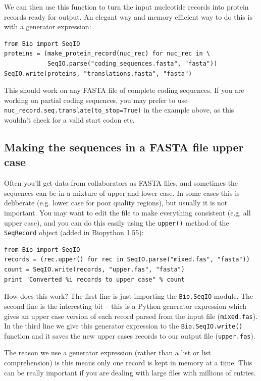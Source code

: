 \documentclass{report}
\begin{document}
We can then use this function to turn the input nucleotide records into protein
records ready for output.  An elegant way and memory efficient way to do this
is with a generator expression:

\begin{verbatim}
from Bio import SeqIO
proteins = (make_protein_record(nuc_rec) for nuc_rec in \
            SeqIO.parse("coding_sequences.fasta", "fasta"))
SeqIO.write(proteins, "translations.fasta", "fasta")
\end{verbatim}

This should work on any FASTA file of complete coding sequences.
If you are working on partial coding sequences, you may prefer to use
\verb|nuc_record.seq.translate(to_stop=True)| in the example above, as
this wouldn't check for a valid start codon etc.

\subsection{Making the sequences in a FASTA file upper case}

Often you'll get data from collaborators as FASTA files, and sometimes the
sequences can be in a mixture of upper and lower case. In some cases this is
deliberate (e.g. lower case for poor quality regions), but usually it is not
important. You may want to edit the file to make everything consistent (e.g.
all upper case), and you can do this easily using the \verb|upper()| method
of the \verb|SeqRecord| object (added in Biopython 1.55):

\begin{verbatim}
from Bio import SeqIO
records = (rec.upper() for rec in SeqIO.parse("mixed.fas", "fasta"))
count = SeqIO.write(records, "upper.fas", "fasta")
print "Converted %i records to upper case" % count
\end{verbatim}

How does this work? The first line is just importing the \verb|Bio.SeqIO|
module. The second line is the interesting bit -- this is a Python
generator expression which gives an upper case version of each record
parsed from the input file (\texttt{mixed.fas}). In the third line we give
this generator expression to the \verb|Bio.SeqIO.write()| function and it
saves the new upper cases records to our output file (\texttt{upper.fas}).

The reason we use a generator expression (rather than a list or list
comprehension) is this means only one record is kept in memory at a time.
This can be really important if you are dealing with large files with
millions of entries.
\end{document}
